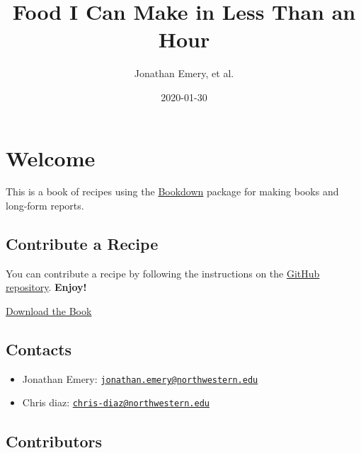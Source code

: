 \documentclass[openany]{book}
\title{Food I Can Make in Less Than an Hour}
\author{Jonathan Emery, et al.}
\date{2020-01-30}
\providecommand{\tightlist}{%
  \setlength{\itemsep}{0pt}\setlength{\parskip}{0pt}}
\begin{document}
\maketitle

{
\setcounter{tocdepth}{1}
\tableofcontents
}
\chapter*{Welcome}\label{welcome}

This is a book of recipes using the
\href{https://bookdown.org/}{Bookdown} package for making books and
long-form reports.

\section*{Contribute a Recipe}\label{contribute-a-recipe}

You can contribute a recipe by following the instructions on the
\href{https://github.com/chrisdaaz/recipe-bookdown}{GitHub repository}.
\textbf{Enjoy!}

\href{./recipe-bookdown.pdf}{Download the Book}

\section*{Contacts}\label{contacts}

\begin{itemize}
\tightlist
\item
  Jonathan Emery:
  \href{mailto:jonathan.emery@northwestern.edu}{\nolinkurl{jonathan.emery@northwestern.edu}}
\item
  Chris diaz:
  \href{mailto:chris-diaz@northwestern.edu}{\nolinkurl{chris-diaz@northwestern.edu}}
\end{itemize}

\section{Contributors}\label{contributors}
\end{document}
